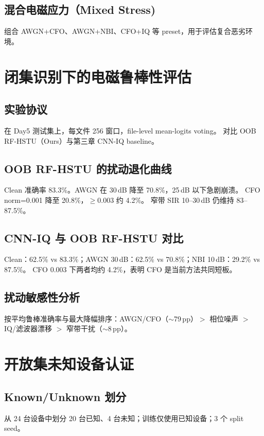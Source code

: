 \subsection{混合电磁应力（Mixed Stress)}
组合 AWGN+CFO、AWGN+NBI、CFO+IQ 等 preset，用于评估复合恶劣环境。

\section{闭集识别下的电磁鲁棒性评估}
\label{sec:ch5_closed}

\subsection{实验协议}
在 Day5 测试集上，每文件 256 窗口，file-level mean-logits voting。
对比 OOB RF-HSTU（Ours）与第三章 CNN-IQ baseline。

\subsection{OOB RF-HSTU 的扰动退化曲线}
Clean 准确率 83.3\%。AWGN 在 30\,dB 降至 70.8\%，25\,dB 以下急剧崩溃。
CFO norm=0.001 降至 20.8\%，$\geq 0.003$ 约 4.2\%。
窄带 SIR 10--30\,dB 仍维持 83--87.5\%。

\subsection{CNN-IQ 与 OOB RF-HSTU 对比}
Clean：62.5\% vs 83.3\%；AWGN 30\,dB：62.5\% vs 70.8\%；NBI 10\,dB：29.2\% vs 87.5\%。
CFO 0.003 下两者均约 4.2\%，表明 CFO 是当前方法共同短板。

\subsection{扰动敏感性分析}
按平均鲁棒准确率与最大降幅排序：AWGN/CFO（$\sim$79\,pp）$>$ 相位噪声 $>$ IQ/滤波器漂移 $>$ 窄带干扰（$\sim$8\,pp）。

\section{开放集未知设备认证}
\label{sec:ch5_openset}

\subsection{Known/Unknown 划分}
从 24 台设备中划分 20 台已知、4 台未知；训练仅使用已知设备；3 个 split seed。

